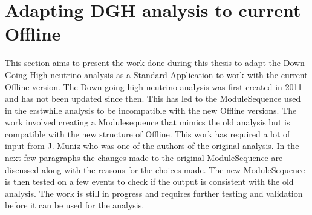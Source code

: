 \chapter{Adapting DGH analysis to current Offline}
\label{sec:app_4}
This section aims to present the work done during this thesis to adapt the Down Going High neutrino analysis as a Standard Application to work with the current Offline version. The Down going high neutrino analysis was first created in 2011 and has not been updated since then. This has led to the ModuleSequence used in the erstwhile analysis to be incompatible with the new Offline versions. The work involved creating a Modulesequence that mimics the old analysis but is compatible with the new structure of Offline. This work has required a lot of input from J. Muniz  who was one of the authors of the original analysis. In the next few paragraphs the changes made to the original ModuleSequence are discussed along with the reasons for the choices made. The new ModuleSequence is then tested on a few events to check if the output is consistent with the old analysis. The work is still in progress and requires further testing and validation before it can be used for the analysis. 

